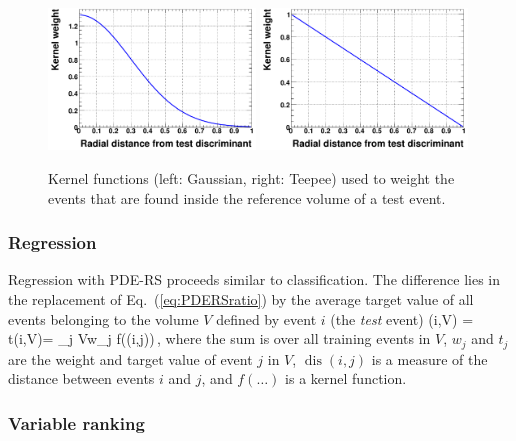 \begin{figure}[t]
\begin{center}
   \includegraphics[width=0.49\textwidth]{plots/pders_gauss}
   \includegraphics[width=0.49\textwidth]{plots/pders_teepee}
\end{center}
\vspace{-0.5cm}
\caption[.]{Kernel functions (left: Gaussian, right: Teepee) 
 		   used to weight the events that are found 
	      inside the reference volume of a test event.}
\label{fig:pdersKernels}
\end{figure}

\subsubsection*{Regression}

Regression with PDE-RS proceeds  similar to classification. The difference 
lies in the replacement of Eq.~(\ref{eq:PDERSratio}) by the average target value 
of all events belonging to the volume $V$ defined by event $i$ (the {\em test} event)
\beq
\label{eq:PDERSregratio}
	\RPDERS(i,V) = \langle t(i,V)\rangle = 
                       {\sum_{j \in V}{w_{j} f((i,j))}}\,,
\eeq
where the sum is over all training events in $V$, $w_j$ and $t_j$ are the weight and 
target value of event $j$ in $V$, $\operatorname{dis}(i,j)$ is a measure of the distance
between events $i$ and $j$, and $f(\dots)$ is a kernel function.

\subsubsection{Variable ranking}

